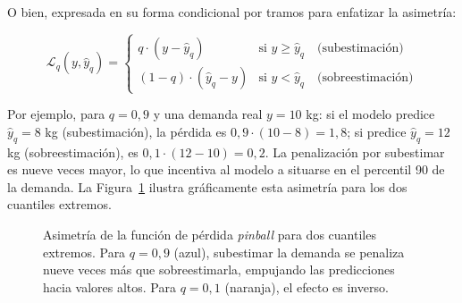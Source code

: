 O bien, expresada en su forma condicional por tramos para enfatizar la asimetría:

\begin{equation}
    \mathcal{L}_q(y, \hat{y}_q) =
    \begin{cases}
        q \cdot (y - \hat{y}_q) & \text{si } y \ge \hat{y}_q \quad \text{(subestimación)} \\
        (1 - q) \cdot (\hat{y}_q - y) & \text{si } y < \hat{y}_q \quad \text{(sobreestimación)}
    \end{cases}
\end{equation}

Por ejemplo, para $q = 0{,}9$ y una demanda real $y = 10$ kg: si el modelo predice $\hat{y}_q = 8$ kg (subestimación), la pérdida es $0{,}9 \cdot (10 - 8) = 1{,}8$; si predice $\hat{y}_q = 12$ kg (sobreestimación), es $0{,}1 \cdot (12 - 10) = 0{,}2$. La penalización por subestimar es nueve veces mayor, lo que incentiva al modelo a situarse en el percentil 90 de la demanda. La Figura~\ref{fig:pinball_asymmetry} ilustra gráficamente esta asimetría para los dos cuantiles extremos.

\begin{figure}[H]
\centering
\shorthandoff{>}%
\shorthandon{>}%
\caption[Asimetría de la pérdida \textit{pinball}]{Asimetría de la función de pérdida \textit{pinball} para dos cuantiles extremos.
Para $q=0{,}9$ (azul), subestimar la demanda se penaliza nueve veces más que sobreestimarla,
empujando las predicciones hacia valores altos. Para $q=0{,}1$ (naranja), el efecto es inverso.}
\label{fig:pinball_asymmetry}
\end{figure}

